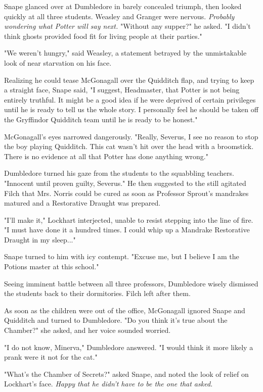 \documentclass[a4paper,11pt]{article}
\begin{document}
Snape glanced over at Dumbledore in barely concealed triumph, then looked quickly at all three students. Weasley and Granger were nervous. \emph{Probably wondering what Potter will say next.} "Without any supper?" he asked. "I didn't think ghosts provided food fit for living people at their parties."

"We weren't hungry," said Weasley, a statement betrayed by the unmistakable look of near starvation on his face.

Realizing he could tease McGonagall over the Quidditch flap, and trying to keep a straight face, Snape said, "I suggest, Headmaster, that Potter is not being entirely truthful. It might be a good idea if he were deprived of certain privileges until he is ready to tell us the whole story. I personally feel he should be taken off the Gryffindor Quidditch team until he is ready to be honest."

McGonagall's eyes narrowed dangerously. "Really, Severus, I see no reason to stop the boy playing Quidditch. This cat wasn't hit over the head with a broomstick. There is no evidence at all that Potter has done anything wrong."

Dumbledore turned his gaze from the students to the squabbling teachers. "Innocent until proven guilty, Severus." He then suggested to the still agitated Filch that Mrs. Norris could be cured as soon as Professor Sprout's mandrakes matured and a Restorative Draught was prepared.

"I'll make it," Lockhart interjected, unable to resist stepping into the line of fire. "I must have done it a hundred times. I could whip up a Mandrake Restorative Draught in my sleep..."

Snape turned to him with icy contempt. "Excuse me, but I believe I am the Potions master at this school."

Seeing imminent battle between all three professors, Dumbledore wisely dismissed the students back to their dormitories. Filch left after them.

As soon as the children were out of the office, McGonagall ignored Snape and Quidditch and turned to Dumbledore. "Do you think it's true about the Chamber?" she asked, and her voice sounded worried.

"I do not know, Minerva," Dumbledore answered. "I would think it more likely a prank were it not for the cat."

"What's the Chamber of Secrets?" asked Snape, and noted the look of relief on Lockhart's face. \emph{Happy that he didn't have to be the one that asked.}
\end{document}
